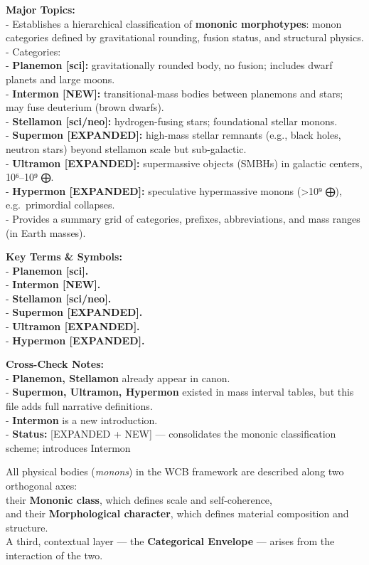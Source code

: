 \documentclass[
  letterpaper,
]{book}
\begin{document}
\textbf{Major Topics:}\\
- Establishes a hierarchical classification of \textbf{mononic
morphotypes}: monon categories defined by gravitational rounding, fusion
status, and structural physics.\\
- Categories:\\
- \textbf{Planemon {[}sci{]}:} gravitationally rounded body, no fusion;
includes dwarf planets and large moons.\\
- \textbf{Intermon {[}NEW{]}:} transitional-mass bodies between
planemons and stars; may fuse deuterium (brown dwarfs).\\
- \textbf{Stellamon {[}sci/neo{]}:} hydrogen-fusing stars; foundational
stellar monons.\\
- \textbf{Supermon {[}EXPANDED{]}:} high-mass stellar remnants (e.g.,
black holes, neutron stars) beyond stellamon scale but sub-galactic.\\
- \textbf{Ultramon {[}EXPANDED{]}:} supermassive objects (SMBHs) in
galactic centers, 10⁶--10⁹ ⨁.\\
- \textbf{Hypermon {[}EXPANDED{]}:} speculative hypermassive monons
(\textgreater10⁹ ⨁), e.g.~primordial collapses.\\
- Provides a summary grid of categories, prefixes, abbreviations, and
mass ranges (in Earth masses).

\textbf{Key Terms \& Symbols:}\\
- \textbf{Planemon {[}sci{]}.}\\
- \textbf{Intermon {[}NEW{]}.}\\
- \textbf{Stellamon {[}sci/neo{]}.}\\
- \textbf{Supermon {[}EXPANDED{]}.}\\
- \textbf{Ultramon {[}EXPANDED{]}.}\\
- \textbf{Hypermon {[}EXPANDED{]}.}

\textbf{Cross-Check Notes:}\\
- \textbf{Planemon, Stellamon} already appear in canon.\\
- \textbf{Supermon, Ultramon, Hypermon} existed in mass interval tables,
but this file adds full narrative definitions.\\
- \textbf{Intermon} is a new introduction.\\
- \textbf{Status:} {[}EXPANDED + NEW{]} --- consolidates the mononic
classification scheme; introduces Intermon

All physical bodies (\emph{monons}) in the WCB framework are described
along two orthogonal axes:\\
their \textbf{Mononic class}, which defines scale and self-coherence,\\
and their \textbf{Morphological character}, which defines material
composition and structure.\\
A third, contextual layer --- the \textbf{Categorical Envelope} ---
arises from the interaction of the two.
\end{document}
